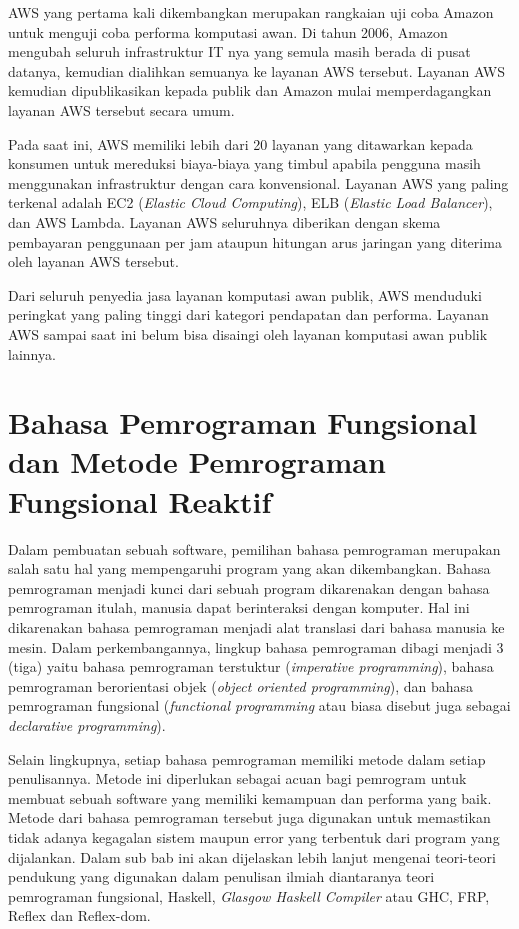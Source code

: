 \documentclass[pi.tex]{subfile}
\begin{document}
\hspace{5pt}AWS yang pertama kali dikembangkan merupakan rangkaian uji coba Amazon untuk menguji coba performa komputasi awan. Di tahun 2006, Amazon mengubah seluruh infrastruktur IT nya yang semula masih berada di pusat datanya, kemudian dialihkan semuanya ke layanan AWS tersebut. Layanan AWS kemudian dipublikasikan kepada publik dan Amazon mulai memperdagangkan layanan AWS tersebut secara umum.

\hspace{5pt}Pada saat ini, AWS memiliki lebih dari 20 layanan yang ditawarkan kepada konsumen untuk mereduksi biaya-biaya yang timbul apabila pengguna masih menggunakan infrastruktur dengan cara konvensional. Layanan AWS yang paling terkenal adalah EC2 (\emph{Elastic Cloud Computing}), ELB (\emph{Elastic Load Balancer}), dan AWS Lambda. Layanan AWS seluruhnya diberikan dengan skema pembayaran penggunaan per jam ataupun hitungan arus jaringan yang diterima oleh layanan AWS tersebut.

\hspace{5pt}Dari seluruh penyedia jasa layanan komputasi awan publik, AWS menduduki peringkat yang paling tinggi dari kategori pendapatan dan performa. Layanan AWS sampai saat ini belum bisa disaingi oleh layanan komputasi awan publik lainnya.

\section{Bahasa Pemrograman Fungsional dan Metode Pemrograman Fungsional Reaktif}
Dalam pembuatan sebuah software, pemilihan bahasa pemrograman merupakan salah satu hal yang mempengaruhi program yang akan dikembangkan. Bahasa pemrograman menjadi kunci dari sebuah program dikarenakan dengan bahasa pemrograman itulah, manusia dapat berinteraksi dengan komputer. Hal ini dikarenakan bahasa pemrograman menjadi alat translasi dari bahasa manusia ke mesin. Dalam perkembangannya, lingkup bahasa pemrograman dibagi menjadi 3 (tiga) yaitu bahasa pemrograman terstuktur (\emph{imperative programming}), bahasa pemrograman berorientasi objek (\emph{object oriented programming}), dan bahasa pemrograman fungsional (\emph{functional programming} atau biasa disebut juga sebagai \emph{declarative programming}).

Selain lingkupnya, setiap bahasa pemrograman memiliki metode dalam setiap penulisannya. Metode ini diperlukan sebagai acuan bagi pemrogram untuk membuat sebuah software yang memiliki kemampuan dan performa yang baik. Metode dari bahasa pemrograman tersebut juga digunakan untuk memastikan tidak adanya kegagalan sistem maupun error yang terbentuk dari program yang dijalankan. Dalam sub bab ini akan dijelaskan lebih lanjut mengenai teori-teori pendukung yang digunakan dalam penulisan ilmiah diantaranya teori pemrograman fungsional, Haskell, \emph{Glasgow Haskell Compiler} atau GHC, FRP, Reflex dan Reflex-dom.
\end{document}
